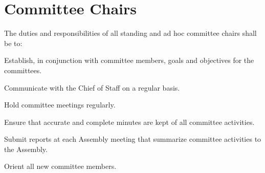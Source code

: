 \section{Committee Chairs}
The duties and responsibilities of all standing and ad hoc committee chairs shall be to:
\begin{bylaws-number}
  \item Establish, in conjunction with committee members, goals and objectives for the committees.
  \item Communicate with the Chief of Staff on a regular basis.
  \item Hold committee meetings regularly.
  \item Ensure that accurate and complete minutes are kept of all committee activities.
  \item Submit reports at each Assembly meeting that summarize committee activities to the Assembly.
  \item Orient all new committee members.
\end{bylaws-number}
